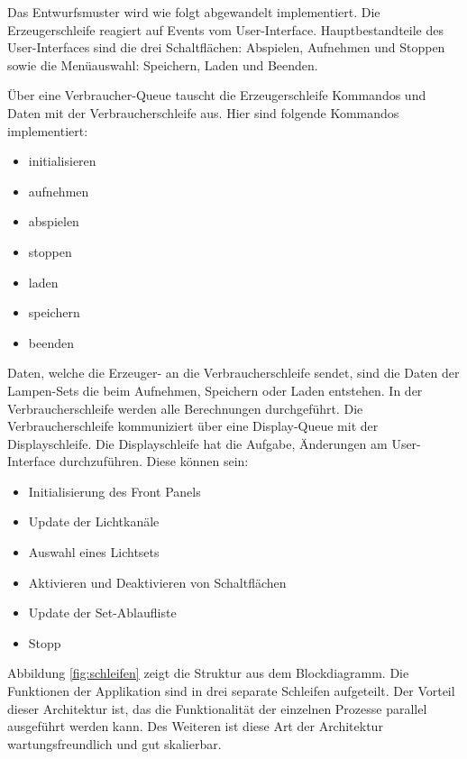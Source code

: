Das Entwurfsmuster wird wie folgt abgewandelt implementiert.  Die Erzeugerschleife reagiert auf Events vom User-Interface. 
Hauptbestandteile des User-Interfaces  sind die drei Schaltflächen: Abspielen, Aufnehmen und Stoppen sowie die Menüauswahl: Speichern, Laden und Beenden.

Über eine Verbraucher-Queue tauscht die Erzeugerschleife Kommandos und Daten mit der Verbraucherschleife aus. Hier sind folgende Kommandos implementiert:
\begin{itemize}
\item initialisieren
\item aufnehmen
\item abspielen
\item stoppen
\item laden
\item speichern 
\item beenden
\end{itemize}
Daten, welche die Erzeuger- an die Verbraucherschleife sendet, sind die Daten der Lampen-Sets die beim Aufnehmen, Speichern oder Laden entstehen. 
In der Verbraucherschleife werden alle Berechnungen durchgeführt. Die Verbraucherschleife kommuniziert über eine Display-Queue mit der Displayschleife.
Die Displayschleife hat die Aufgabe, Änderungen am User-Interface durchzuführen. Diese können sein:
\begin{itemize}
\item Initialisierung des Front Panels
\item Update der Lichtkanäle
\item Auswahl eines Lichtsets
\item Aktivieren und Deaktivieren von Schaltflächen
\item Update der Set-Ablaufliste
\item Stopp
\end{itemize}

Abbildung \ref{fig:schleifen} zeigt die Struktur aus dem Blockdiagramm. 
Die Funktionen der Applikation sind in drei separate Schleifen aufgeteilt. Der Vorteil dieser Architektur ist, das die Funktionalität der einzelnen Prozesse parallel ausgeführt werden kann. 
Des Weiteren ist diese Art der Architektur wartungsfreundlich und gut skalierbar. 


